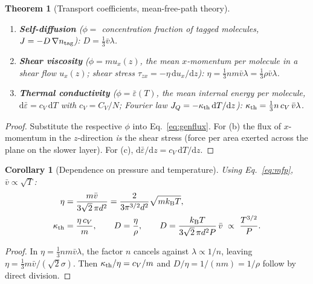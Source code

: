 \documentclass[11pt,a4paper]{report}
\theoremstyle{definition}
\theoremstyle{plain}
\newtheorem{theorem}[definition]{Theorem}
\newtheorem{corollary}[definition]{Corollary}
\newcommand{\kB}{k_{\mathrm{B}}}
\newcommand{\dd}{\mathrm{d}}
\newcommand{\vbar}{\bar{v}}
\begin{document}
\begin{theorem}[Transport coefficients, mean-free-path theory]\label{thm:transport}
\begin{enumerate}[label=(\alph*),nosep]
\item \textbf{Self-diffusion} ($\phi=$ concentration fraction of tagged molecules, $J=-D\,\nabla n_{\rm tag}$):
$D=\tfrac13\vbar\lambda$.
\item \textbf{Shear viscosity} ($\phi=mu_x(z)$, the mean $x$-momentum per molecule in a shear flow $u_x(z)$; shear stress $\tau_{zx}=-\eta\,\dd u_x/\dd z$):
$\eta=\tfrac13nm\vbar\lambda=\tfrac13\rho\vbar\lambda$.
\item \textbf{Thermal conductivity} ($\phi=\bar\varepsilon(T)$, the mean internal energy per molecule, $\dd\bar\varepsilon=c_V\,\dd T$ with $c_V=C_V/N$; Fourier law $J_Q=-\kappa_{\rm th}\,\dd T/\dd z$):
$\kappa_{\rm th}=\tfrac13n\,c_V\,\vbar\lambda$.
\end{enumerate}
\end{theorem}
\begin{proof}
Substitute the respective $\phi$ into Eq.~\eqref{eq:genflux}. For (b) the flux of $x$-momentum in the $z$-direction \emph{is} the shear stress (force per area exerted across the plane on the slower layer). For (c), $\dd\bar\varepsilon/\dd z=c_V\,\dd T/\dd z$.
\end{proof}

\begin{corollary}[Dependence on pressure and temperature]\label{cor:transport}
Using Eq.~\eqref{eq:mfp}, $\vbar\propto\sqrt T$:
\begin{align}
\eta&=\frac{m\vbar}{3\sqrt2\,\pi d^2}=\frac{2}{3\pi^{3/2}d^2}\sqrt{m\kB T},\\
\kappa_{\rm th}&=\frac{\eta\,c_V}{m},\qquad D=\frac{\eta}{\rho},\qquad D=\frac{\kB T}{3\sqrt2\,\pi d^2P}\,\vbar\ \propto\ \frac{T^{3/2}}{P}.
\end{align}
\end{corollary}
\begin{proof}
In $\eta=\tfrac13nm\vbar\lambda$, the factor $n$ cancels against $\lambda\propto1/n$, leaving $\eta=\tfrac13m\vbar/(\sqrt2\sigma)$. Then $\kappa_{\rm th}/\eta=c_V/m$ and $D/\eta=1/(nm)=1/\rho$ follow by direct division.
\end{proof}
\end{document}
